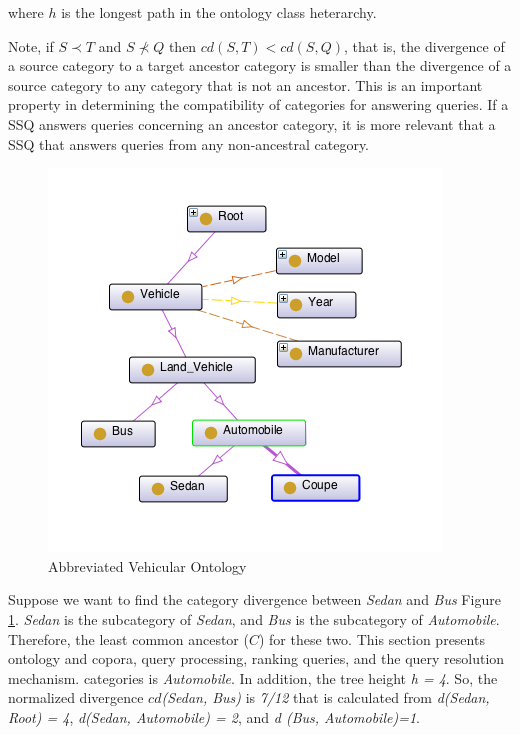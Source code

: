\noindent where $h$ is the longest path in the ontology class heterarchy.

Note, if $S \prec T$ and $S \not\prec Q$ then $cd(S,T) < cd(S,Q)$, that is, the divergence of a source category to a target ancestor category is smaller than the divergence of a source category to any category that is not an ancestor. This is an important property in determining the compatibility of categories for answering queries.  If a SSQ answers queries concerning an ancestor category, it is more relevant that a SSQ that answers queries from any non-ancestral category.



\begin{figure}[t]
	\includegraphics[scale=.65]{../img/OntologyDiagram.png}
	\caption{Abbreviated Vehicular Ontology}
	\label{fig:vehicular_ontology}
\end{figure}

Suppose we want to find the category divergence between \textit{Sedan} and \textit{Bus} Figure \ref{fig:vehicular_ontology}. \textit{Sedan} is the subcategory of \textit{Sedan}, and \textit{Bus} is the subcategory of \textit{Automobile}. Therefore, the least common ancestor ($C$) for these two. This section presents ontology and copora, query processing, ranking queries, and the query resolution mechanism. categories is \textit{Automobile}. In addition, the tree height \textit{h = 4}. So, the normalized divergence $cd$\textit{(Sedan, Bus)} is \textit{7/12} that is calculated from \textit{d(Sedan, Root) = 4}, \textit{d(Sedan, Automobile) = 2}, and \textit{d (Bus, Automobile)=1}.


